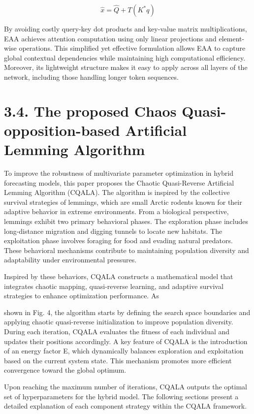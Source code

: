 \documentclass[
  10
]{article}
\begin{document}
\[
\widehat {x} = \widehat {Q} + T \left(K ^ {*} q\right) \tag {13}
\]

By avoiding costly query-key dot products and key-value matrix
multiplications, EAA achieves attention computation using only linear
projections and element-wise operations. This simplified yet effective
formulation allows EAA to capture global contextual dependencies while
maintaining high computational efficiency. Moreover, its lightweight
structure makes it easy to apply across all layers of the network,
including those handling longer token sequences.

\section{3.4. The proposed Chaos Quasi-opposition-based Artificial
Lemming
Algorithm}\label{the-proposed-chaos-quasi-opposition-based-artificial-lemming-algorithm}

To improve the robustness of multivariate parameter optimization in
hybrid forecasting models, this paper proposes the Chaotic Quasi-Reverse
Artificial Lemming Algorithm (CQALA). The algorithm is inspired by the
collective survival strategies of lemmings, which are small Arctic
rodents known for their adaptive behavior in extreme environments. From
a biological perspective, lemmings exhibit two primary behavioral
phases. The exploration phase includes long-distance migration and
digging tunnels to locate new habitats. The exploitation phase involves
foraging for food and evading natural predators. These behavioral
mechanisms contribute to maintaining population diversity and
adaptability under environmental pressures.

Inspired by these behaviors, CQALA constructs a mathematical model that
integrates chaotic mapping, quasi-reverse learning, and adaptive
survival strategies to enhance optimization performance. As

shown in Fig. 4, the algorithm starts by defining the search space
boundaries and applying chaotic quasi-reverse initialization to improve
population diversity. During each iteration, CQALA evaluates the fitness
of each individual and updates their positions accordingly. A key
feature of CQALA is the introduction of an energy factor E, which
dynamically balances exploration and exploitation based on the current
system state. This mechanism promotes more efficient convergence toward
the global optimum.

Upon reaching the maximum number of iterations, CQALA outputs the
optimal set of hyperparameters for the hybrid model. The following
sections present a detailed explanation of each component strategy
within the CQALA framework.
\end{document}

